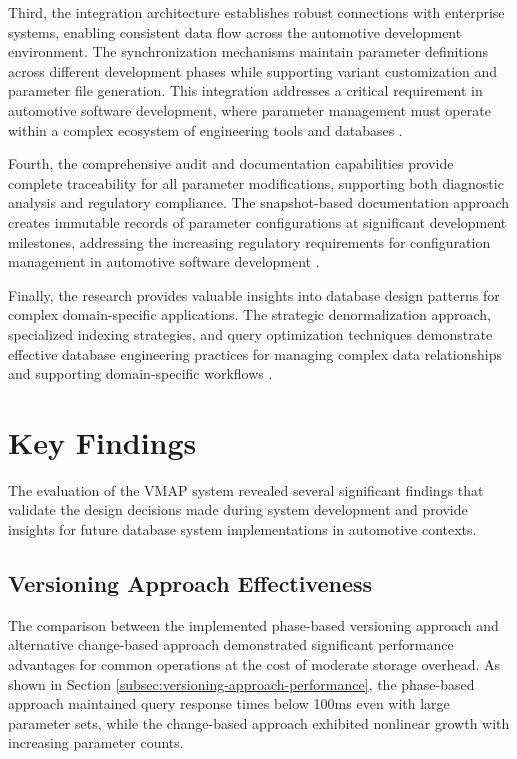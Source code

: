 Third, the integration architecture establishes robust connections with enterprise systems, enabling consistent data flow across the automotive development environment. The synchronization mechanisms maintain parameter definitions across different development phases while supporting variant customization and parameter file generation. This integration addresses a critical requirement in automotive software development, where parameter management must operate within a complex ecosystem of engineering tools and databases \cite{hohpe2002enterprise}.

Fourth, the comprehensive audit and documentation capabilities provide complete traceability for all parameter modifications, supporting both diagnostic analysis and regulatory compliance. The snapshot-based documentation approach creates immutable records of parameter configurations at significant development milestones, addressing the increasing regulatory requirements for configuration management in automotive software development \cite{staron2021automotive}.

Finally, the research provides valuable insights into database design patterns for complex domain-specific applications. The strategic denormalization approach, specialized indexing strategies, and query optimization techniques demonstrate effective database engineering practices for managing complex data relationships and supporting domain-specific workflows \cite{obe2017postgresql}.

\section{Key Findings}
\label{sec:key-findings}

The evaluation of the \ac{VMAP} system revealed several significant findings that validate the design decisions made during system development and provide insights for future database system implementations in automotive contexts.

\subsection{Versioning Approach Effectiveness}
\label{subsec:versioning-effectiveness}

The comparison between the implemented phase-based versioning approach and alternative change-based approach demonstrated significant performance advantages for common operations at the cost of moderate storage overhead. As shown in Section \ref{subsec:versioning-approach-performance}, the phase-based approach maintained query response times below 100ms even with large parameter sets, while the change-based approach exhibited nonlinear growth with increasing parameter counts.

